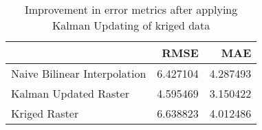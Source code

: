 \begin{table}
\caption{Improvement in error metrics after applying Kalman Updating of kriged data}
\label{tab:stcroix_gebco_raster_error}
\begin{tabular}{lrr}
\toprule
 & RMSE & MAE \\
\midrule
Naive Bilinear Interpolation & 6.427104 & 4.287493 \\
Kalman Updated Raster & 4.595469 & 3.150422 \\
Kriged Raster & 6.638823 & 4.012486 \\
\bottomrule
\end{tabular}
\end{table}
